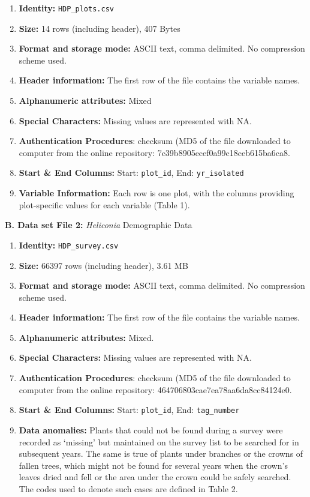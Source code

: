 \documentclass[
  man, donotrepeattitle,floatsintext]{apa6}
\begin{document}
\begin{enumerate}
\def\labelenumi{\arabic{enumi}.}
\item
  \textbf{Identity:} \texttt{HDP\_plots.csv}
\item
  \textbf{Size:} 14 rows (including header), 407 Bytes
\item
  \textbf{Format and storage mode:} ASCII text, comma delimited. No
  compression scheme used.
\item
  \textbf{Header information:} The first row of the file contains the variable names.
\item
  \textbf{Alphanumeric attributes:} Mixed
\item
  \textbf{Special Characters:} Missing values are represented with NA.
\item
  \textbf{Authentication Procedures}: checksum (MD5 of the file downloaded to computer from the online repository: 7c39b8905ecef0a99c18ceb615ba6ca8.
\item
  \textbf{Start \& End Columns:} Start: \texttt{plot\_id}, End: \texttt{yr\_isolated}
\item
  \textbf{Variable Information:} Each row is one plot, with the columns providing plot-specific values for each variable (Table 1).
\end{enumerate}

\noindent 
\textbf{B. Data set File 2:} \emph{Heliconia} Demographic Data

\begin{enumerate}
\def\labelenumi{\arabic{enumi}.}
\item
  \textbf{Identity:} \texttt{HDP\_survey.csv}
\item
  \textbf{Size:} 66397 rows (including header), 3.61 MB
\item
  \textbf{Format and storage mode:} ASCII text, comma delimited. No compression scheme used.
\item
  \textbf{Header information:} The first row of the file contains the variable names.
\item
  \textbf{Alphanumeric attributes:} Mixed.
\item
  \textbf{Special Characters:} Missing values are represented with NA.
\item
  \textbf{Authentication Procedures}: checksum (MD5 of the file downloaded to computer from the online repository: 464706803cae7ea78aa6da8cc84124e0.
\item
  \textbf{Start \& End Columns:} Start: \texttt{plot\_id}, End: \texttt{tag\_number}
\item
  \textbf{Data anomalies:} Plants that could not be found during a survey were recorded as `missing' but maintained on the survey list to be searched for in subsequent years. The same is true of plants under branches or the crowns of fallen trees, which might not be found for several years when the crown's leaves dried and fell or the area under the crown could be safely searched. The codes used to denote such cases are defined in Table 2.
\end{enumerate}
\end{document}
